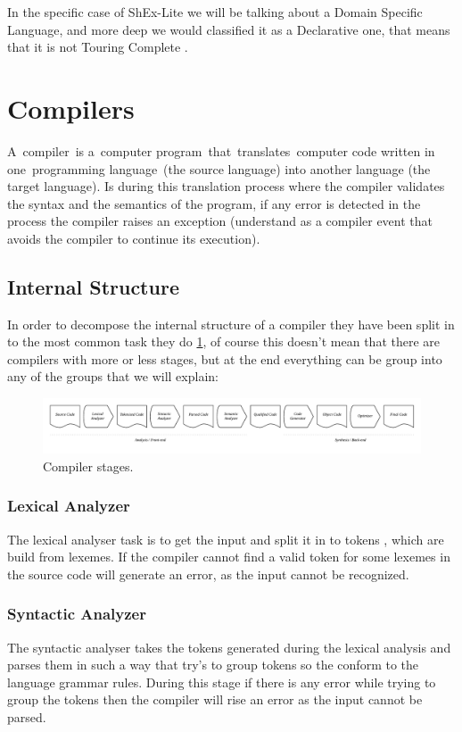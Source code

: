 In the specific case of ShEx-Lite we will be talking about a Domain Specific Language, and more deep we would classified
it as a Declarative one, that means that it is not Touring Complete \cite{touring-complete}.


\section{Compilers}
A compiler is a computer program that translates computer code written in one programming language (the source language)
into another language (the target language). Is during this translation process where the compiler validates the syntax
and the semantics of the program, if any error is detected in the process the compiler raises an exception (understand
as a compiler event that avoids the compiler to continue its execution).

\subsection{Internal Structure}
In order to decompose the internal structure of a compiler they have been split in to the most common task they do
\cref{fig:compiler-stages}, of course this doesn’t mean that there are compilers with more or less stages, but at the
end everything can be group into any of the groups that we will explain:

\begin{figure}
  \includegraphics[width=\textwidth]{images/compiler-stages.pdf}
  \centering
  \caption[Compiler stages]{Compiler stages.}
  \label{fig:compiler-stages}
\end{figure}

\subsubsection{Lexical Analyzer}
The lexical analyser task is to get the input and split it in to tokens \cite{lexical-analysis}, which are build
from lexemes. If the compiler cannot find a valid token for some lexemes in the source code will generate an error,
as the input cannot be recognized.

\subsubsection{Syntactic Analyzer}
The syntactic analyser takes the tokens generated during the lexical analysis and parses them in such a way that try’s
to group tokens so the conform to the language grammar rules. During this stage if there is any error while trying to
group the tokens then the compiler will rise an error as the input cannot be parsed.

